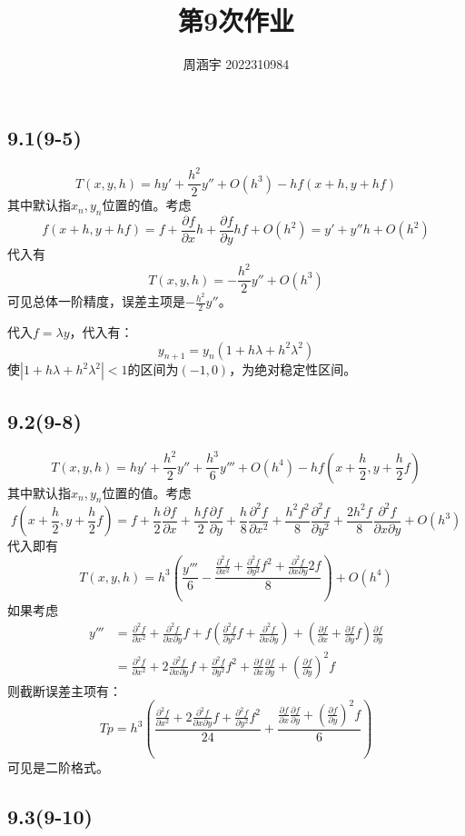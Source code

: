 \documentclass[UTF8,zihao=5]{ctexart}
\title{{\bfseries 第9次作业}}
\author{周涵宇 2022310984}
\date{}
\newcommand*{\pd}[2]{\frac{\partial #1}{\partial #2}}
\newcommand*{\pdcd}[3]
{\frac{\partial^2 #1}{\partial #2 \partial #3}}
\begin{document}
\maketitle

\subsection*{9.1(9-5)}

$$
    T(x,y,h) = hy' + \frac{h^2}{2}y'' + O(h^3) - hf(x+h,y+hf)
$$
其中默认指$x_n,y_n$位置的值。考虑
$$
    f(x+h,y+hf)=f+\pd{f}{x}h+\pd{f}{y}hf+O(h^2)
    =y'+y''h+O(h^2)
$$
代入有
$$
    T(x,y,h) = -\frac{h^2}{2}y'' + O(h^3)
$$
可见总体一阶精度，误差主项是$-\frac{h^2}{2}y''$。

代入$f=\lambda y$，代入有：
$$
    y_{n+1}=y_n(1+h\lambda+h^2\lambda^2)
$$
使$|1+h\lambda+h^2\lambda^2|<1$的区间为$(-1,0)$，为绝对稳定性区间。

\subsection*{9.2(9-8)}

$$
    T(x,y,h) = hy' + \frac{h^2}{2}y'' + \frac{h^3}{6}y''' + O(h^4)
    -hf(x+\frac{h}{2},y+\frac{h}{2}f)
$$
其中默认指$x_n,y_n$位置的值。考虑
$$
    f(x+\frac{h}{2},y+\frac{h}{2}f)=
    f
    +\frac{h}{2}\pd{f}{x}
    +\frac{hf}{2}\pd{f}{y}
    +\frac{h}{8}\pd{^2f}{x^2}
    +\frac{h^2f^2}{8}\pd{^2f}{y^2}
    +\frac{2h^2f}{8}\pdcd{f}{x}{y}
    +O(h^3)
$$
代入即有
$$
    T(x,y,h)
    =
    h^3\left(
    \frac{y'''}{6}-\frac{\pd{^2f}{x^2}+\pd{^2f}{y^2}f^2+\pdcd{f}{x}{y}2f}{8}
    \right)
    +O(h^4)
$$
如果考虑
$$
    \begin{aligned}
        y''' & =\pd{^2f}{x^2}+\pdcd{f}{x}{y}f+
        f\left(
        \pd{^2f}{y^2}f+\pdcd{f}{x}{y}
        \right)
        +
        \left(
        \pd{f}{x}+\pd{f}{y}f
        \right)\pd{f}{y}                                             \\
             & = \pd{^2f}{x^2} + 2\pdcd{f}{x}{y}f + \pd{^2f}{y^2}f^2
        +\pd{f}{x}\pd{f}{y}+\left(\pd{f}{y}\right)^2f
    \end{aligned}
$$
则截断误差主项有：
$$
    Tp = h^3\left(
    \frac{
        \pd{^2f}{x^2} + 2\pdcd{f}{x}{y}f + \pd{^2f}{y^2}f^2}{24}
    +\frac{
        \pd{f}{x}\pd{f}{y}+\left(\pd{f}{y}\right)^2f}{6}
    \right)
$$
可见是二阶格式。

\subsection*{9.3(9-10)}
\end{document}
